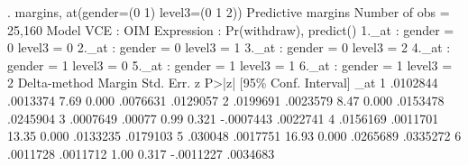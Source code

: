 . margins, at(gender=(0 1) level3=(0 1 2))
{\smallskip}
Predictive margins                              Number of obs     =     25,160
Model VCE    : OIM
{\smallskip}
Expression   : Pr(withdraw), predict()
{\smallskip}
1._at        : gender          =           0
               level3          =           0
{\smallskip}
2._at        : gender          =           0
               level3          =           1
{\smallskip}
3._at        : gender          =           0
               level3          =           2
{\smallskip}
4._at        : gender          =           1
               level3          =           0
{\smallskip}
5._at        : gender          =           1
               level3          =           1
{\smallskip}
6._at        : gender          =           1
               level3          =           2
{\smallskip}
             {\VBAR}            Delta-method
             {\VBAR}     Margin   Std. Err.      z    P>|z|     [95\% Conf. Interval]
         _at {\VBAR}
          1  {\VBAR}   .0102844   .0013374     7.69   0.000     .0076631    .0129057
          2  {\VBAR}   .0199691   .0023579     8.47   0.000     .0153478    .0245904
          3  {\VBAR}   .0007649     .00077     0.99   0.321    -.0007443    .0022741
          4  {\VBAR}   .0156169   .0011701    13.35   0.000     .0133235    .0179103
          5  {\VBAR}    .030048   .0017751    16.93   0.000     .0265689    .0335272
          6  {\VBAR}   .0011728   .0011712     1.00   0.317    -.0011227    .0034683
{\smallskip}
